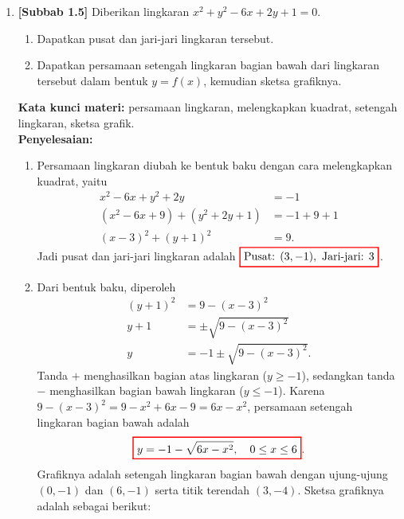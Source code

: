 \documentclass[10pt,openany,a4paper]{article}
\theoremstyle{definition}
\theoremstyle{definition}
\theoremstyle{plain}
\newenvironment{jawab}[2][tes]{%
\par\noindent\textbf{Kata kunci materi:} #1.\\
\textbf{Penyelesaian:} #2%
}{}
\begin{document}
\begin{enumerate}
    \item \textbf{[Subbab 1.5]} Diberikan lingkaran $x^2+y^2-6x+2y+1=0$.
    \begin{enumerate}
        \item Dapatkan pusat dan jari-jari lingkaran tersebut.
        \item Dapatkan persamaan setengah lingkaran bagian bawah dari lingkaran tersebut dalam bentuk $y=f(x)$, kemudian sketsa grafiknya.
    \end{enumerate}
    \begin{jawab}[persamaan lingkaran, melengkapkan kuadrat, setengah lingkaran, sketsa grafik]{
        \begin{enumerate}
            \item Persamaan lingkaran diubah ke bentuk baku dengan cara melengkapkan kuadrat, yaitu
            \begin{align*}
                x^2-6x+y^2+2y &= -1\\
                (x^2-6x+9)+(y^2+2y+1) &= -1+9+1\\
                (x-3)^2+(y+1)^2 &= 9.
            \end{align*}
            Jadi pusat dan jari-jari lingkaran adalah $\colorlet{oldcolor}{.}
        \color{red}
        \setlength{\fboxrule}{1pt} \boxed{\color{oldcolor}\text{Pusat: }(3,-1),~\text{Jari-jari: }3}\color{oldcolor}$.
            \item Dari bentuk baku, diperoleh
            \begin{align*}
                (y+1)^2 &= 9-(x-3)^2\\
                y+1 &= \pm\sqrt{9-(x-3)^2}\\
                y &= -1\pm\sqrt{9-(x-3)^2}.
            \end{align*}
            Tanda $+$ menghasilkan bagian atas lingkaran ($y\geq -1$), sedangkan tanda $-$ menghasilkan bagian bawah lingkaran ($y\leq -1$). Karena $9-(x-3)^2=9-x^2+6x-9=6x-x^2$, persamaan setengah lingkaran bagian bawah adalah
            \begin{align*}
                \colorlet{oldcolor}{.}
        \color{red}
        \setlength{\fboxrule}{1pt} \boxed{\color{oldcolor}y=-1-\sqrt{6x-x^2},\quad 0\leq x\leq 6}\color{oldcolor}.
            \end{align*}
            Grafiknya adalah setengah lingkaran bagian bawah dengan ujung-ujung $(0,-1)$ dan $(6,-1)$ serta titik terendah $(3,-4)$. Sketsa grafiknya adalah sebagai berikut:
            \begin{center}

\end{center}
\end{enumerate}}
\end{jawab}
\end{enumerate}
\end{document}
